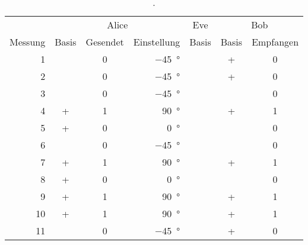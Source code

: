 \begin{longtable}[c]{rccrccc}
	\caption{.}
	\label{tab:abhoeren}
	\\
	\toprule
	& \multicolumn{3}{c}{Alice} & \multicolumn{1}{c}{Eve} & \multicolumn{2}{c}{Bob} \\
	\cmidrule(lr){2-4}\cmidrule(lr){5-5}\cmidrule(lr){6-7}
	{Messung} & {Basis} & {Gesendet} & {Einstellung} & {Basis} & {Basis} & {Empfangen} \\
	\midrule
	 1\hspace{1.5em} & \times & 0 & \qty{-45}{\degree}\hspace{1.5em} &  &      + & 0 \\
	 2\hspace{1.5em} & \times & 0 & \qty{-45}{\degree}\hspace{1.5em} &  &      + & 0 \\
	 3\hspace{1.5em} & \times & 0 & \qty{-45}{\degree}\hspace{1.5em} &  & \times & 0 \\
	 4\hspace{1.5em} &      + & 1 & \qty{ 90}{\degree}\hspace{1.5em} &  &      + & 1 \\
	 5\hspace{1.5em} &      + & 0 & \qty{  0}{\degree}\hspace{1.5em} &  & \times & 0 \\
	 6\hspace{1.5em} & \times & 0 & \qty{-45}{\degree}\hspace{1.5em} &  & \times & 0 \\
	 7\hspace{1.5em} &      + & 1 & \qty{ 90}{\degree}\hspace{1.5em} &  &      + & 1 \\
	 8\hspace{1.5em} &      + & 0 & \qty{  0}{\degree}\hspace{1.5em} &  & \times & 0 \\
	 9\hspace{1.5em} &      + & 1 & \qty{ 90}{\degree}\hspace{1.5em} &  &      + & 1 \\
	10\hspace{1.5em} &      + & 1 & \qty{ 90}{\degree}\hspace{1.5em} &  &      + & 1 \\
	11\hspace{1.5em} & \times & 0 & \qty{-45}{\degree}\hspace{1.5em} &  &      + & 0 \\

\end{longtable}
